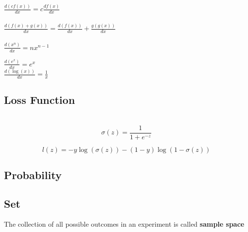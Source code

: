 \documentclass[11pt]{article}
\begin{document}
\begin{flushleft}
\centering
$\frac{d(cf(x))}{dx}= c\frac{df(x)}{dx}$   \\
\quad \\ \quad\quad
$\frac{d(f(x)+g(x))}{dx}=\frac{d(f(x))}{dx}+\frac{g(g(x))}{dx}$ \\
\quad \\
\quad\quad\quad\quad\quad\quad\quad\quad\quad
$\frac{d(x^n)}{dx}=nx^{n-1}$ 
\newline

${\displaystyle \frac{d(e^x)}{dx}= e^x}$ \\
${\displaystyle \frac{d(\log(x))}{dx}=\frac{1}{x}}$ \\
\end{flushleft}

\begin{flushleft}
\subsection{Loss Function}
\quad \\
$$\sigma(z)=\frac{1}{1+e^{−z}}$$

$$l(z) = -y\log(\sigma(z)) - (1−y)\log⁡(1−\sigma(z))$$

\end{flushleft}

\begin{flushleft}
\section{Probability}
\subsection{Set}
The collection of all possible outcomes in an experiment is called \textbf{sample space}
\end{flushleft}



\end{document}
